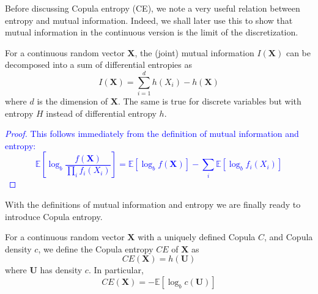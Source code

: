 \documentclass[../Thesis.tex]{subfiles}
\begin{document}
Before discussing Copula entropy (CE), we note a very useful relation between entropy and mutual information. Indeed, we shall later use this to show that mutual information in the continuous version is the limit of the discretization.
\begin{lemma}\label{lemma:mutual information and entropy relation}
    For a continuous random vector $\boldsymbol{X}$, the (joint) mutual information $I\left(\boldsymbol{X}\right)$ can be decomposed into a sum of differential entropies as
    $$I\left(\boldsymbol{X}\right) = \sum_{i=1}^{d} h(X_i) - h\left(\boldsymbol{X}\right)$$
    where $d$ is the dimension of $\boldsymbol{X}$. The same is true for discrete variables but with entropy $H$ instead of differential entropy $h$.
\end{lemma}
\textcolor{blue}{\begin{proof}
        This follows immediately from the definition of mutual information and entropy:
        $$\mathbb{E}\left[\log_b \frac{f\left(\boldsymbol X\right)}{\prod_i f_i\left(X_i\right)}\right] = \mathbb{E}\left[\log_b f\left(\boldsymbol X\right) \right] - \sum_i \mathbb{E}\left[\log_b f_i \left(X_i\right)\right]$$
    \end{proof}}
With the definitions of mutual information and entropy we are finally ready to introduce Copula entropy.
\begin{definition}\label{def:copula entropy}
    For a continuous random vector $\boldsymbol{X}$ with a uniquely defined Copula $C$, and Copula density $c$, we define the Copula entropy $CE$ of $\boldsymbol{X}$ as
    $$CE\left(\boldsymbol{X}\right) = h\left(\boldsymbol U\right)$$
    where $\boldsymbol U$ has density $c$. In particular,
    $$CE\left(\boldsymbol{X}\right) = - \mathbb{E}\left[\log_b c \left(\boldsymbol U\right)\right]$$
\end{definition}
\end{document}

